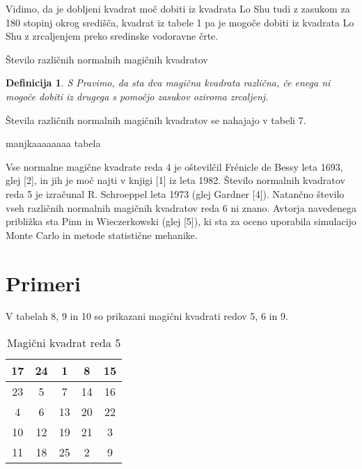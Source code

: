 \documentclass[a4paper,12pt]{article}
\newtheorem{definition}{Definicija}
\begin{document}
Vidimo, da je dobljeni kvadrat moč dobiti iz kvadrata Lo Shu tudi z zasukom za
180 stopinj okrog središča, kvadrat iz tabele 1 pa je mogoče dobiti
iz kvadrata Lo Shu z zrcaljenjem preko sredinske vodoravne črte.

Število različnih normalnih magičnih kvadratov

\begin{definition}
   
S
      Pravimo, da sta dva magična kvadrata \emph{različna}, če enega ni mogoče dobiti
      iz drugega s pomočjo zasukov oziroma zrcaljenj.
   \end{definition}

Števila različnih normalnih magičnih kvadratov se nahajajo v tabeli 7.

manjkaaaaaaaa tabela 
      



Vse normalne magične kvadrate reda 4 je oštevilčil Frénicle de Bessy
leta 1693, glej [2], in jih je moč najti v knjigi [1]
iz leta 1982. Število normalnih kvadratov reda 5 je izračunal
R. Schroeppel leta 1973 (glej Gardner [4]).
Natančno število vseh različnih normalnih magičnih kvadratov reda 6 ni znano.
Avtorja navedenega približka sta Pinn in Wieczerkowski (glej [5]), ki
sta za oceno uporabila simulacijo Monte Carlo in metode statistične mehanike.


\section{Primeri}

V tabelah 8, 9 in 10 so prikazani
magični kvadrati redov 5, 6 in 9.
\begin{table}[h]
   \centering
   \caption{Magični kvadrat reda 5}
   \label{table:mag5}
   \begin{tabular}{|c|c|c|c|c|}
      \hline
      17 & 24 &  1 &  8 & 15 \\
      \hline
      23 &  5 &  7 & 14 & 16 \\
      \hline
      4 &  6 & 13 & 20 & 22 \\
      \hline
      10 & 12 & 19 & 21 &  3 \\
      \hline
      11 & 18 & 25 &  2 &  9 \\
      \hline
      
   \end{tabular}

\end{table}
\end{document}
